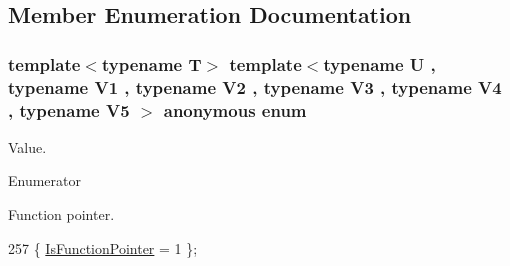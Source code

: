 \subsection{Member Enumeration Documentation}
\subsubsection[{\texorpdfstring{anonymous enum}{anonymous enum}}]{\setlength{\rightskip}{0pt plus 5cm}template$<$typename T$>$ template$<$typename U , typename V1 , typename V2 , typename V3 , typename V4 , typename V5 $>$ anonymous enum}\hypertarget{structTypeTraits_1_1FunctionPtrTraits_3_01U_07_5_08_07V1_00_01V2_00_01V3_00_01V4_00_01V5_08_4_a966acf97f4790d99be17ba2c0a1df4dc}{}\label{structTypeTraits_1_1FunctionPtrTraits_3_01U_07_5_08_07V1_00_01V2_00_01V3_00_01V4_00_01V5_08_4_a966acf97f4790d99be17ba2c0a1df4dc}
Value. \begin{Desc}
\item[Enumerator]\par
\begin{description}
\item[{\em 
Is\+Function\+Pointer\hypertarget{structTypeTraits_1_1FunctionPtrTraits_3_01U_07_5_08_07V1_00_01V2_00_01V3_00_01V4_00_01V5_08_4_a966acf97f4790d99be17ba2c0a1df4dca5239b2c1cac57f8a7aec93117fcd2192}{}\label{structTypeTraits_1_1FunctionPtrTraits_3_01U_07_5_08_07V1_00_01V2_00_01V3_00_01V4_00_01V5_08_4_a966acf97f4790d99be17ba2c0a1df4dca5239b2c1cac57f8a7aec93117fcd2192}
}]Function pointer. \end{description}
\end{Desc}

\begin{DoxyCode}
257 \{ \hyperlink{structTypeTraits_1_1FunctionPtrTraits_3_01U_07_5_08_07V1_00_01V2_00_01V3_00_01V4_00_01V5_08_4_a966acf97f4790d99be17ba2c0a1df4dca5239b2c1cac57f8a7aec93117fcd2192}{IsFunctionPointer} = 1    \};
\end{DoxyCode}
